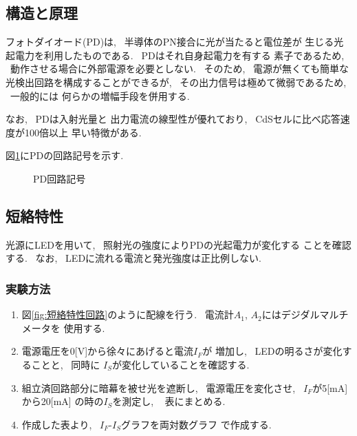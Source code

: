 \documentclass[titlepage]{jsarticle}
\begin{document}
    \subsection{構造と原理} \label{フォトダイオード構造と原理}
        フォトダイオード(PD)は, ~半導体のPN接合に光が当たると電位差が
        生じる光起電力を利用したものである. ~PDはそれ自身起電力を有する
        素子であるため, ~動作させる場合に外部電源を必要としない.
        ~そのため, ~電源が無くても簡単な光検出回路を構成することができるが,
        ~その出力信号は極めて微弱であるため, ~一般的には
        何らかの増幅手段を併用する.
        
        なお, ~PDは入射光量と
        出力電流の線型性が優れており, ~CdSセルに比べ応答速度が100倍以上
        早い特徴がある.
        
        図\ref{fig:PD}にPDの回路記号を示す.

        \begin{figure}[ht]
            \centering
            \caption{PD回路記号}
            \label{fig:PD}
        \end{figure}

    \subsection{短絡特性} \label{短絡特性}
        光源にLEDを用いて, ~照射光の強度によりPDの光起電力が変化する
        ことを確認する. ~なお, ~LEDに流れる電流と発光強度は正比例しない.

        \subsubsection{実験方法}
            \begin{enumerate}
                \item 図\ref{fig:短絡特性回路}のように配線を行う.
                    ~電流計$A_1$, $A_2$にはデジダルマルチメータを
                    使用する.
                \item 電源電圧を0[V]から徐々にあげると電流$I_F$が
                    増加し, ~LEDの明るさが変化することと, ~同時に
                    $I_S$が変化していることを確認する.
                \item 組立済回路部分に暗幕を被せ光を遮断し,
                    ~電源電圧を変化させ, ~$I_F$が5[mA]から20[mA]
                    の時の$I_S$を測定し, ~ 表にまとめる.
                \item 作成した表より, ~$I_F$-$I_S$グラフを両対数グラフ
                    で作成する.
            \end{enumerate}
\end{document}
